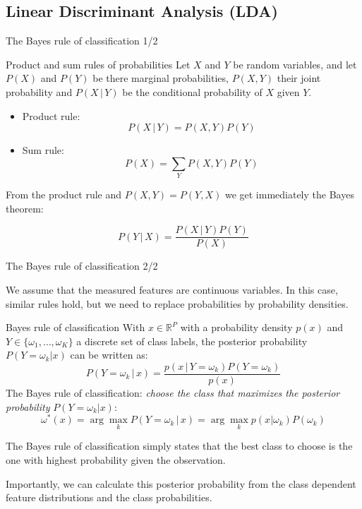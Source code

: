 \documentclass[xcolor=pdftex,dvipsnames,table]{beamer}
\begin{document}
\subsection{Linear Discriminant Analysis (LDA)}

\begin{frame}{The Bayes rule of classification 1/2}

\begin{block}{Product and sum rules of probabilities}
	Let $X$ and $Y$ be random variables, and let $P(X)$ and $P(Y)$ be there marginal probabilities, $P(X,Y)$ their joint probability and $P(X\,|\,Y)$ be the conditional probability of $X$ given $Y$. 
	\begin{itemize}
		\item Product rule: 
		\begin{equation}
			P(X\,|\,Y) = P(X,Y)P(Y)
		\end{equation}
		\item Sum rule:
		\begin{equation}
			P(X) = \sum_Y P(X,Y)P(Y)
		\end{equation}
	\end{itemize}
\end{block}

From the product rule and $P(X,Y)=P(Y,X)$ we get immediately the Bayes theorem:

\begin{equation}
	P(Y \, | \, X) = \frac{P(X \, | \, Y)P(Y)}{P(X)} 
\end{equation}

\end{frame}

\begin{frame}{The Bayes rule of classification 2/2}

We assume that the measured features are continuous variables. In this case, similar rules hold, but we need to replace probabilities by probability densities. 

\begin{block}{Bayes rule of classification}
	With $x \in \mathbb{R}^P$ with a probability density $p(x)$ and $Y \in \{\omega_1, \ldots, \omega_K\}$ a discrete set of class labels, the posterior probability $P(Y=\omega_k|x)$ can be written as:
	\begin{equation}
		P(Y=\omega_k \, | \, x) = \frac{p(x \, | \, Y=\omega_k) P(Y=\omega_k)}{p(x)}
	\end{equation}
	The Bayes rule of classification: \emph{choose the class that maximizes the posterior probability} $P(Y=\omega_k|x)$:
	\begin{equation}
		\omega^{\ast}(x) = \arg\max_k P(Y=\omega_k \, | \, x) = \arg\max_k p(x|\omega_k)P(\omega_k)
	\end{equation}
\end{block}

The Bayes rule of classification simply states that the best class to choose is the one with highest probability given the observation.

Importantly, we can calculate this posterior probability from the class dependent feature distributions and the class probabilities. 
	
\end{frame}
\end{document}
